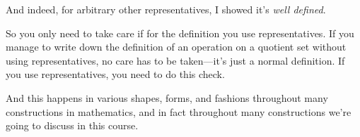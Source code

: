 And indeed, for arbitrary other representatives, I showed it's \emph{well defined}.

So you only need to take care if for the definition you use representatives. If you manage to write down the definition of an operation on a quotient set without using representatives, no care has to be taken---it's just a normal definition. If you use representatives, you need to do this check.

And this happens in various shapes, forms, and fashions throughout many constructions in mathematics, and in fact throughout many constructions we're going to discuss in this course.
